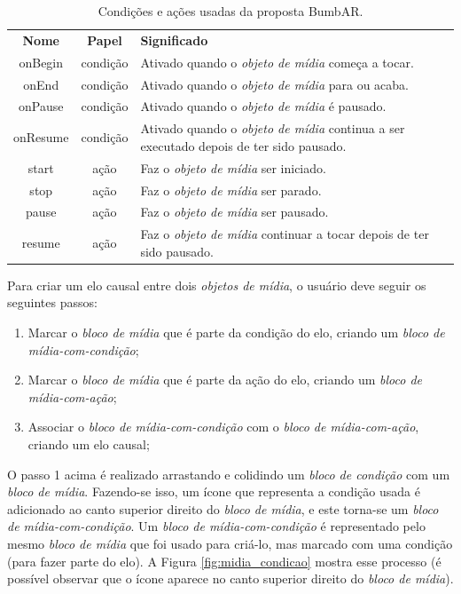 \documentclass[../main.tex]{subfiles}
\begin{document}
\begin{table}[!h]
\small
\centering
\caption{Condições e ações usadas da proposta BumbAR.}
\label{tab:condicoes_acoes}
\begin{tabularx}{0.9\columnwidth}{ccX}
\toprule
\textbf{Nome} & \textbf{Papel} & \textbf{Significado}
\\\otoprule
onBegin       & condição     & Ativado quando o \emph{objeto de mídia} começa a tocar.
\\\midrule
onEnd         & condição     & Ativado quando o \emph{objeto de mídia} para ou acaba.
\\\midrule
onPause       & condição     & Ativado quando o \emph{objeto de mídia} é pausado.
\\\midrule
onResume      & condição     & Ativado quando o \emph{objeto de mídia} continua a ser executado depois de ter sido pausado.
\\\midrule
start         & ação        & Faz o \emph{objeto de mídia} ser iniciado.
\\\midrule
stop          & ação        & Faz o \emph{objeto de mídia} ser parado.
\\\midrule
pause         & ação        & Faz o \emph{objeto de mídia} ser pausado.
\\\midrule
resume        & ação        & Faz o \emph{objeto de mídia} continuar a tocar depois de ter sido pausado.
\\\midrule
\end{tabularx}
\end{table}

Para criar um elo causal entre dois \emph{objetos de mídia}, o usuário deve seguir os seguintes passos:

\begin{enumerate}
    \item Marcar o \emph{bloco de mídia} que é parte da condição do elo, criando um \emph{bloco de mídia-com-condição};
    \item Marcar o \emph{bloco de mídia} que é parte da ação do elo, criando um \emph{bloco de mídia-com-ação};
    \item Associar o \emph{bloco de mídia-com-condição} com o \emph{bloco de mídia-com-ação}, criando um elo causal;
\end{enumerate}

O passo 1 acima é realizado arrastando e colidindo um \emph{bloco de condição} com um \emph{bloco de mídia}. Fazendo-se isso, um ícone que representa a condição usada é adicionado ao canto superior direito do \emph{bloco de mídia}, e este torna-se um \emph{bloco de mídia-com-condição}. Um \emph{bloco de mídia-com-condição} é representado pelo mesmo \emph{bloco de mídia} que foi usado para criá-lo, mas marcado com uma condição (para fazer parte do elo). A Figura \ref{fig:midia_condicao} mostra esse processo (é possível observar que o ícone aparece no canto superior direito do \emph{bloco de mídia}).
\end{document}
